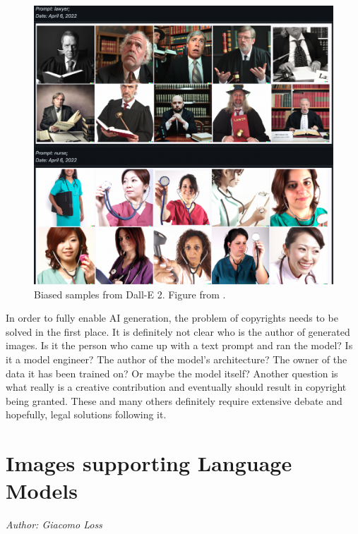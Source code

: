 \documentclass[
]{krantz}
\begin{document}
\begin{figure}

{\centering \includegraphics[width=1\linewidth]{figures/02-02-text-2-img/bias} 

}

\caption{Biased samples from Dall-E 2. Figure from \citet{mishkin2022risks}.}\label{fig:bias}
\end{figure}



In order to fully enable AI generation, the problem of copyrights needs to be solved in the first place. It is definitely not clear who is the author of generated images. Is it the person who came up with a text prompt and ran the model? Is it a model engineer? The author of the model's architecture? The owner of the data it has been trained on? Or maybe the model itself? Another question is what really is a creative contribution and eventually should result in copyright being granted. These and many others definitely require extensive debate and hopefully, legal solutions following it.

\hypertarget{c02-03-img-support-text}{%
\section{Images supporting Language Models}\label{c02-03-img-support-text}}

\emph{Author: Giacomo Loss}
\end{document}
